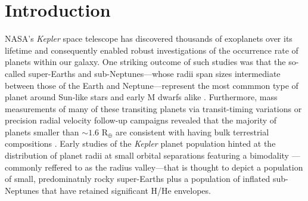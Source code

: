 \documentclass[twocolumn]{emulateapj}
\newcommand{\kepler}[1]{\emph{Kepler}#1}
\begin{document}
\section{Introduction}
NASA's \kepler{} space telescope has discovered thousands of exoplanets over its lifetime and
consequently enabled robust investigations of the occurrence rate of planets within our galaxy.
One striking outcome of such studies was that the so-called super-Earths and sub-Neptunes---whose
radii span sizes intermediate between those of the Earth and Neptune---represent the most commmon
type of planet around Sun-like stars and early M dwarfs alike
\citep[e.g.][]{youdin11,howard12,dressing13,fressin13,petigura13b,morton14,dressing15a,gaidos16,fulton17,hardegree19}.
Furthermore, mass measurements of many of these transiting planets via transit-timing variations
or precision radial velocity follow-up campaigns revealed that the majority of planets
smaller than $\sim 1.6$ R$_{\oplus}$ are consistent with having bulk terrestrial compositions
\citep[e.g.][]{weiss14,dressing15b,rogers15}. Early studies of the \kepler{} planet population
hinted at the distribution of planet radii at small orbital separations featuring a
bimodality \citep[e.g.][]{owen13}---commonly reffered to as the radius valley---that is
thought to depict a population of small, predominatnly rocky super-Earths plus a population
of inflated sub-Neptunes that have retained significant H/He envelopes.
\end{document}
